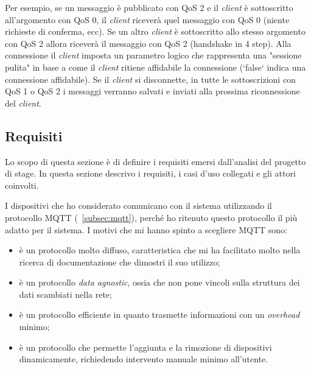 Per esempio, se un messaggio è pubblicato con QoS 2 e il \emph{client} è sottoscritto all'argomento con QoS 0, il \emph{client} riceverà quel messaggio con QoS 0 (niente richieste di conferma, ecc).
Se un altro \emph{client} è sottoscritto allo stesso argomento con QoS 2 allora riceverà il messaggio con QoS 2 (\gls{handshake} in 4 step).
Alla connessione il \emph{client} imposta un parametro logico che rappresenta una "sessione pulita" in base a come il \emph{client} ritiene affidabile la connessione (`false` indica una connessione affidabile). Se il \emph{client} si disconnette, in tutte le sottoscrizioni con QoS 1 o QoS 2 i messaggi verranno salvati e inviati alla prossima riconnessione del \emph{client}.

\subsection{Requisiti}

Lo scopo di questa sezione è di definire i requisiti emersi dall’analisi del progetto di stage.
In questa sezione descrivo i requisiti, i casi d'uso collegati e gli attori coinvolti.

I dispositivi che ho considerato comunicano con il sistema utilizzando il protocollo MQTT (~\ref{subsec:mqtt}), perché ho ritenuto questo protocollo il più adatto per il sistema.
I motivi che mi hanno spinto a scegliere MQTT sono:
\begin{itemize}
	\item è un protocollo molto diffuso, caratteristica che mi ha facilitato molto nella ricerca di documentazione che dimostri il suo utilizzo;
	\item è un protocollo \emph{data agnostic}, ossia che non pone vincoli sulla struttura dei dati scambiati nella rete;
	\item è un protocollo efficiente in quanto trasmette informazioni con un \emph{overhead} minimo;
	\item è un protocollo che permette l'aggiunta e la rimozione di dispositivi dinamicamente, richiedendo intervento manuale minimo all'utente.
\end{itemize}


